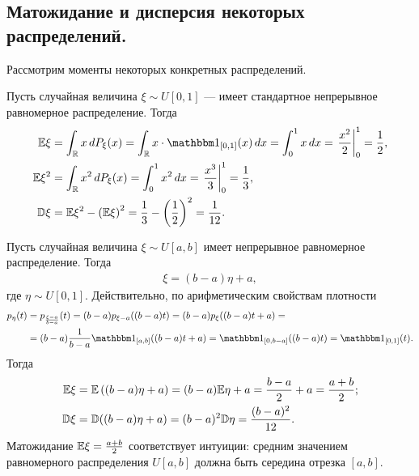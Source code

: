 \documentclass[../main.tex]{subfiles}
\begin{document}
\subsection{Матожидание и дисперсия некоторых распределений.}

Рассмотрим моменты некоторых конкретных распределений.

\begin{exmpl}
 Пусть случайная величина $ \xi \sim U[0,1] $ --- имеет стандартное непрерывное равномерное распределение. Тогда
 \begin{align*}
  \E\xi &= \int_{\R} x\,dP_\xi(x)  = \int_{\R} x \cdot \Ind_{[0,1]}  (x)\,dx= \int_{0}^{1} x\,dx = \left. \frac{x^{2}}{2} \right|_0^{1} = \frac{1}{2}, \\ 
   \E\xi^{2} &= \int_{\R} x^2\,dP_\xi(x) = \int_{0}^{1} x^{2}\,dx = \left. \frac{x^{3}}{3} \right|_0^{1} = \frac{1}{3},\\
    \D\xi &=\E\xi^{2} - \left( \E\xi \right)^{2} = \frac{1}{3} - \left(\frac{1}{2}\right)^2 = \frac{1}{12}.
   \end{align*} 
  \end{exmpl}

  \begin{exmpl}
   Пусть случайная величина $ \xi \sim U[a,b] $ имеет непрерывное равномерное распределение. Тогда
   \begin{align*}
    \xi = (b - a)\eta + a,
   \end{align*} где $ \eta \sim U[0,1] $. Действительно, по арифметическим свойствам плотности 
   \begin{align*}
    p_\eta(t) &= p_{\frac{\xi - a}{b - a}}(t) = (b-a)p_{\xi - a}((b-a)t) = (b-a)p_\xi((b-a)t + a) = \\
    &= (b-a) \frac{1}{b-a} \Ind_{[a,b]}((b-a)t + a) = \Ind_{[0, b - a]}((b-a)t) = \Ind_{[0,1]}(t).
   \end{align*}
   Тогда
   \begin{align*}
    \mathbb E\xi &= \mathbb E \left( (b-a)\eta + a \right) = (b-a)\mathbb E\eta + a = \frac{b-a}{2} + a = \frac{a+b}{2}; \\
    \mathbb D\xi &= \mathbb D((b-a)\eta + a) = (b-a)^{2}\mathbb D\eta = \frac{(b-a)^{2}}{12}.
   \end{align*} Матожидание $ \mathbb E\xi = \frac{a+b}{2} $ соответствует интуиции: средним значением равномерного распределения $ U[a,b] $ должна быть середина отрезка $ [a,b] $.
  \end{exmpl}
\end{document}
